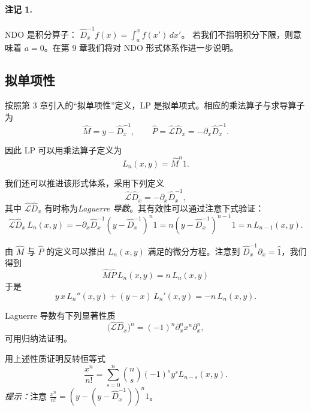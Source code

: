\paragraph{注记 1.} NDO 是积分算子：
$\hat D_x^{-1} f(x) = \int_a^x f(x')\,dx'$。
若我们不指明积分下限，则意味着 $a=0$。在第 9 章我们将对 NDO 形式体系作进一步说明。

\subsection*{拟单项性}

按照第 3 章引入的``拟单项性''定义，LP 是拟单项式。相应的乘法算子与求导算子为
\begin{equation}
\hat M = y - \hat D_x^{-1},
\qquad
\hat P = \hat{\mathcal L}\!\hat D_x = -\partial_x \hat D_x^{-1}.
\label{eq:4.1.7}
\end{equation}

因此 LP 可以用乘法算子定义为
\begin{equation}
L_n(x,y) = \hat M^n 1.
\label{eq:4.1.8}
\end{equation}

我们还可以推进该形式体系，采用下列定义
\begin{equation}
\hat{\mathcal L}\!\hat D_x
= -\partial_x \hat D_x^{-1},
\label{eq:4.1.9}
\end{equation}
其中 $\hat{\mathcal L}\!\hat D_x$ 有时称为\emph{Laguerre 导数}。其有效性可以通过注意下式验证：
\begin{equation}
\hat{\mathcal L}\!\hat D_x\,L_n(x,y)
= -\partial_x \hat D_x^{-1}(y-\hat D_x^{-1})^n 1
= n(y-\hat D_x^{-1})^{n-1}1
= n\,L_{n-1}(x,y).
\label{eq:4.1.10}
\end{equation}

由 $\hat M$ 与 $\hat P$ 的定义可以推出 $L_n(x,y)$ 满足的微分方程。注意到 $\hat D_x^{-1}\partial_x = \hat 1$，我们得到
\begin{equation}
\hat M\hat P\,L_n(x,y) = n\,L_n(x,y)
\label{eq:4.1.11}
\end{equation}
于是
\begin{equation}
y\,x\,L_n''(x,y) + (y-x)\,L_n'(x,y) = -n\,L_n(x,y).
\label{eq:4.1.12}
\end{equation}

Laguerre 导数有下列显著性质
\begin{equation}
\bigl(\hat{\mathcal L}\!\hat D_x\bigr)^n
= (-1)^n \partial_x^n x^n \partial_x^n,
\label{eq:4.1.13}
\end{equation}
可用归纳法证明。

\begin{exercise}
用上述性质证明反转恒等式
\begin{equation}
\frac{x^n}{n!}
= \sum_{s=0}^{n} \binom{n}{s} (-1)^s y^s L_{n-s}(x,y).
\label{eq:4.1.14}
\end{equation}
\emph{提示：}注意 $\frac{x^n}{n!} = (y - (y-\hat D_x^{-1}))^n 1$。
\end{exercise}

